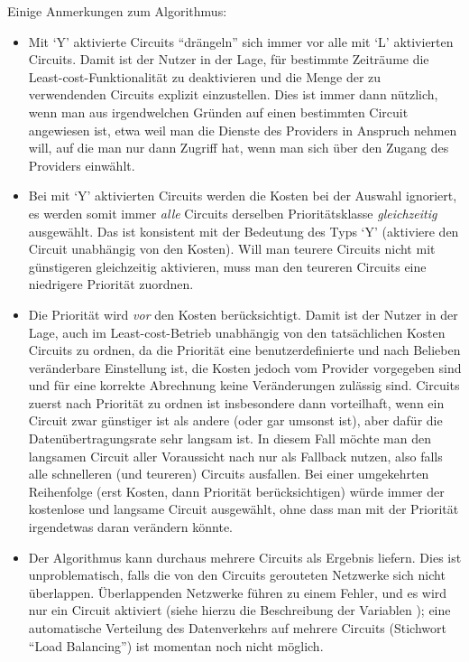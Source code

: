 Einige Anmerkungen zum Algorithmus:
\begin{itemize}
\item Mit `Y' aktivierte Circuits ``drängeln'' sich immer vor alle mit `L'
aktivierten Circuits. Damit ist der Nutzer in der Lage, für bestimmte Zeiträume
die Least-cost-Funktionalität zu deaktivieren und die Menge der zu verwendenden
Circuits explizit einzustellen. Dies ist immer dann nützlich, wenn man aus
irgendwelchen Gründen auf einen bestimmten Circuit angewiesen ist, etwa weil
man die Dienste des Providers in Anspruch nehmen will, auf die man nur dann
Zugriff hat, wenn man sich über den Zugang des Providers einwählt.

\item Bei mit `Y' aktivierten Circuits werden die Kosten bei der Auswahl
ignoriert, es werden somit immer \emph{alle} Circuits derselben Prioritätsklasse
\emph{gleichzeitig} ausgewählt. Das ist konsistent mit der Bedeutung des Typs
`Y' (aktiviere den Circuit unabhängig von den Kosten). Will man teurere Circuits
nicht mit günstigeren gleichzeitig aktivieren, muss man den teureren Circuits
eine niedrigere Priorität zuordnen.

\item Die Priorität wird \emph{vor} den Kosten berücksichtigt. Damit ist der
Nutzer in der Lage, auch im Least-cost-Betrieb unabhängig von den tatsächlichen
Kosten Circuits zu ordnen, da die Priorität eine benutzerdefinierte und nach
Belieben veränderbare Einstellung ist, die Kosten jedoch vom Provider
vorgegeben sind und für eine korrekte Abrechnung keine Veränderungen zulässig
sind. Circuits zuerst nach Priorität zu ordnen ist insbesondere dann
vorteilhaft, wenn ein Circuit zwar günstiger ist als andere (oder gar umsonst
ist), aber dafür die Datenübertragungsrate sehr langsam ist. In diesem Fall
möchte man den langsamen Circuit aller Voraussicht nach nur als Fallback
nutzen, also falls alle schnelleren (und teureren) Circuits ausfallen. Bei
einer umgekehrten Reihenfolge (erst Kosten, dann Priorität berücksichtigen)
würde immer der kostenlose und langsame Circuit ausgewählt, ohne dass man mit
der Priorität irgendetwas daran verändern könnte.

\item Der Algorithmus kann durchaus mehrere Circuits als Ergebnis liefern. Dies
ist unproblematisch, falls die von den Circuits gerouteten Netzwerke sich nicht
überlappen. Überlappenden Netzwerke führen zu einem Fehler, und es wird nur
ein Circuit aktiviert (siehe hierzu die Beschreibung der Variablen
); eine automatische Verteilung des Datenverkehrs auf
mehrere Circuits (Stichwort ``Load Balancing'') ist momentan noch nicht möglich.
\end{itemize}

